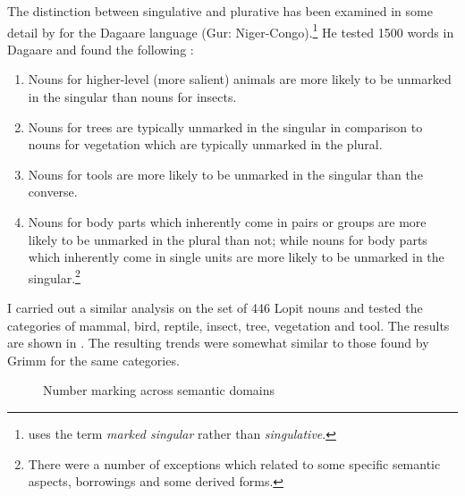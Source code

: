 \documentclass[output=paper]{langsci/langscibook}
\begin{document}
The distinction between singulative and plurative has been examined in some detail by \citet{Grimm2012} for the Dagaare language (Gur: Niger-Congo).\footnote{\citet{Grimm2012} uses the term \textit{marked singular} rather than \textit{singulative}.} He tested 1500 words in Dagaare and found the following \citep[50]{Grimm2012}:

\begin{enumerate}[label=\roman*.]
\item Nouns for higher-level (more salient) animals are more likely to be unmarked in the singular than nouns for insects. 
\item Nouns for trees are typically unmarked in the singular in comparison to nouns for vegetation which are typically unmarked in the plural. 
\item Nouns for tools are more likely to be unmarked in the singular than the converse. 
\item Nouns for body parts which inherently come in pairs or groups are more likely to be unmarked in the plural than not; while nouns for body parts which inherently come in single units are more likely to be unmarked in the singular.\footnote{There were a number of exceptions which related to some specific semantic aspects, borrowings and some derived forms.}
\end{enumerate}

I carried out a similar analysis on the set of 446 Lopit nouns and tested the categories of mammal, bird, reptile, insect, tree, vegetation and tool. The results are shown in . The resulting trends were somewhat similar to those found by Grimm for the same categories. 

\begin{figure}
\caption{Number marking across semantic domains}
\label{fig:moodie:1}
\end{figure}
\end{document}
